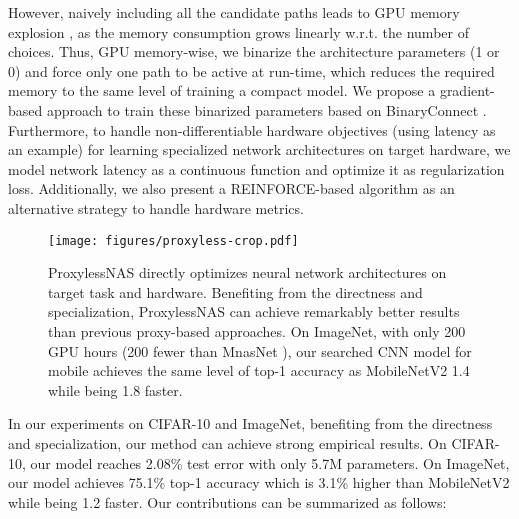 \documentclass{article} \usepackage{iclr2019_conference,times}
\begin{document}
However, naively including all the candidate paths leads to GPU memory explosion \citep{liu2018darts,bender2018understanding}, as the memory consumption grows linearly w.r.t. the number of choices. Thus, GPU memory-wise, we binarize the architecture parameters (1 or 0) and force only one path to be active at run-time, which reduces the required memory to the same level of training a compact model. We propose a gradient-based approach to train these binarized parameters based on BinaryConnect \citep{courbariaux2015binaryconnect}. Furthermore, to handle non-differentiable hardware objectives (using latency as an example) for learning specialized network architectures on target hardware, we model network latency as a continuous function and optimize it as regularization loss. Additionally, we also present a REINFORCE-based \citep{williams1992simple} algorithm as an alternative strategy to handle hardware metrics.

\begin{figure}[t]
    \vspace{-10pt}
    \centering
    \texttt{[image: figures/proxyless-crop.pdf]}
    \caption{ProxylessNAS directly optimizes neural network architectures on target task and hardware. Benefiting from the directness and specialization, ProxylessNAS can achieve remarkably better results than previous proxy-based approaches. On ImageNet, with only 200 GPU hours (200  fewer than MnasNet \citep{tan2018mnasnet}), our searched CNN model for mobile achieves the same level of top-1 accuracy as MobileNetV2 1.4 while being 1.8 faster.}
    \vspace{-10pt}
    \label{fig:proxyless}
\end{figure}

In our experiments on CIFAR-10 and ImageNet, benefiting from the directness and specialization, our method can achieve strong empirical results. On CIFAR-10, our model reaches 2.08\% test error with only 5.7M parameters. On ImageNet, our model achieves 75.1\% top-1 accuracy which is 3.1\% higher than MobileNetV2 \citep{sandler2018mobilenetv2} while being 1.2 faster. Our contributions can be summarized as follows:
\end{document}
